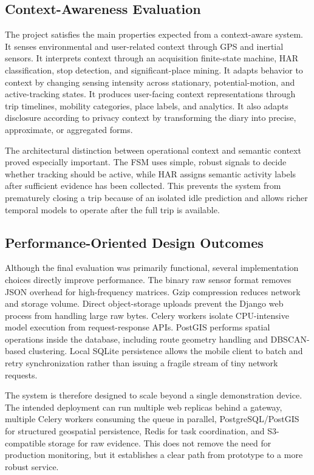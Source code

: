 \documentclass[conference,a4paper]{IEEEtran}
\begin{document}
\subsection{Context-Awareness Evaluation}

The project satisfies the main properties expected from a context-aware system. It senses environmental and user-related context through GPS and inertial sensors. It interprets context through an acquisition finite-state machine, HAR classification, stop detection, and significant-place mining. It adapts behavior to context by changing sensing intensity across stationary, potential-motion, and active-tracking states. It produces user-facing context representations through trip timelines, mobility categories, place labels, and analytics. It also adapts disclosure according to privacy context by transforming the diary into precise, approximate, or aggregated forms.

The architectural distinction between operational context and semantic context proved especially important. The FSM uses simple, robust signals to decide whether tracking should be active, while HAR assigns semantic activity labels after sufficient evidence has been collected. This prevents the system from prematurely closing a trip because of an isolated idle prediction and allows richer temporal models to operate after the full trip is available.

\subsection{Performance-Oriented Design Outcomes}

Although the final evaluation was primarily functional, several implementation choices directly improve performance. The binary raw sensor format removes JSON overhead for high-frequency matrices. Gzip compression reduces network and storage volume. Direct object-storage uploads prevent the Django web process from handling large raw bytes. Celery workers isolate CPU-intensive model execution from request-response APIs. PostGIS performs spatial operations inside the database, including route geometry handling and DBSCAN-based clustering. Local SQLite persistence allows the mobile client to batch and retry synchronization rather than issuing a fragile stream of tiny network requests.

The system is therefore designed to scale beyond a single demonstration device. The intended deployment can run multiple web replicas behind a gateway, multiple Celery workers consuming the queue in parallel, PostgreSQL/PostGIS for structured geospatial persistence, Redis for task coordination, and S3-compatible storage for raw evidence. This does not remove the need for production monitoring, but it establishes a clear path from prototype to a more robust service.
\end{document}
